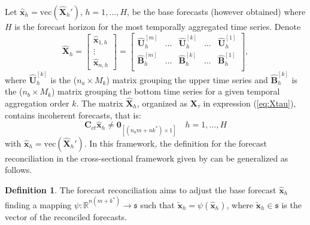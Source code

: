 \documentclass[a4paper,11pt]{article}
\newcommand{\xvet}{\bm{x}}
\newcommand{\Bvet}{\bm{B}}
\newcommand{\Cvet}{\bm{C}}
\newcommand{\Uvet}{\bm{U}}
\newcommand{\Xvet}{\bm{X}}
\newcommand{\Zerovet}{\bm{0}}
\theoremstyle{definition}
\newtheorem{definition}{Definition}[section]
\begin{document}
Let $\widehat{\xvet}_{h} = \mathrm{vec}\left(\widehat{\Xvet}_{h}'\right)$, $h = 1, ..., H$, be the base forecasts (however obtained) where $H$ is the forecast horizon for the most temporally aggregated time series. Denote
$$
	\widehat{\Xvet}_{h} = \begin{bmatrix}
	\widehat{\xvet}_{1,h}\\
	\vdots\\
	\widehat{\xvet}_{n,h}
\end{bmatrix} =\begin{bmatrix}
\widehat{\Uvet}_{h}^{[m]} & \dots & \widehat{\Uvet}_{h}^{[k]} & \dots & \widehat{\Uvet}_{h}^{[1]} \\[0.25cm]
\widehat{\Bvet}_{h}^{[m]} & \dots & \widehat{\Bvet}_{h}^{[k]} & \dots & \widehat{\Bvet}_{h}^{[1]} \\ \end{bmatrix},
$$
where $\widehat{\Uvet}_{h}^{[k]}$ is the ($n_a\times M_k$) matrix grouping the upper time series and $\widehat{\Bvet}_{h}^{[k]}$ is the ($n_b\times M_k$) matrix grouping the bottom time series for a given temporal aggregation order $k$. The matrix $\widehat{\Xvet}_{h}$, organized as ${\Xvet}_{\tau}$ in expression (\ref{eq:Xtau}), contains incoherent forecasts, that is:
$$
\Cvet_{ct} \widehat{\xvet}_{h} \neq \Zerovet_{[(n_am+nk^\ast)\times1]} \quad h = 1, ..., H
$$
with $\widehat{\xvet}_{h} = \mathrm{vec}\left(\widehat{\Xvet}_{h}'\right)$. In this framework, the definition for the forecast reconciliation in the cross-sectional framework given by \cite{panagiotelis2021} can be generalized as follows.
\begin{definition}
	The forecast reconciliation aims to adjust the base forecast $\widehat{\xvet}_{h}$ finding a mapping $\psi: \mathbb{R}^{n(m+k^\ast)} \rightarrow \mathfrak{s}$ such that $\widetilde{\xvet}_{h} = \psi\left(\widehat{\xvet}_{h}\right)$, where $\widetilde{\xvet}_{h} \in \mathfrak{s}$ is the vector of the reconciled forecasts.
\end{definition}
\end{document}
